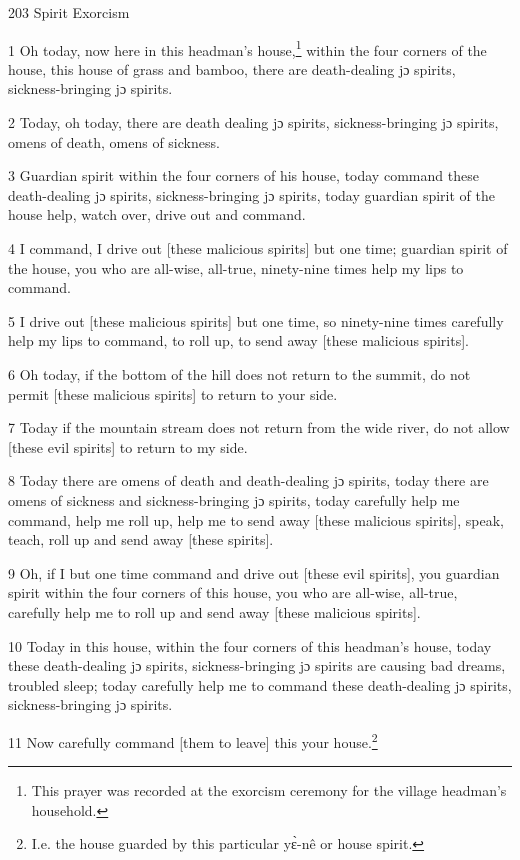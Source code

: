 
203 Spirit Exorcism

1 Oh today, now here in this headman's house,\footnote{This prayer was recorded at the exorcism ceremony for the village headman's household.} within the four corners of the
house, this house of grass and bamboo, there are death-dealing jɔ spirits, sickness-bringing
jɔ spirits.

2 Today, oh today, there are death dealing jɔ spirits, sickness-bringing jɔ spirits,
omens of death, omens of sickness.

3 Guardian spirit within the four corners of his house, today command these death-dealing
jɔ spirits, sickness-bringing jɔ spirits, today guardian spirit of the house
help, watch over, drive out and command.

4 I command, I drive out [these malicious spirits] but one time; guardian spirit
of the house, you who are all-wise, all-true, ninety-nine times help my lips to
command.

5 I drive out [these malicious spirits] but one time, so ninety-nine times carefully
help my lips to command, to roll up, to send away [these malicious spirits].

6 Oh today, if the bottom of the hill does not return to the summit, do not permit
[these malicious spirits] to return to your side.

7 Today if the mountain stream does not return from the wide river, do not allow
[these evil spirits] to return to my side.

8 Today there are omens of death and death-dealing jɔ spirits, today there are
omens of sickness and sickness-bringing jɔ spirits, today carefully help me command,
help me roll up, help me to send away [these malicious spirits], speak, teach,
roll up and send away [these spirits].

9 Oh, if I but one time command and drive out [these evil spirits], you guardian
spirit within the four corners of this house, you who are all-wise, all-true, carefully
help me to roll up and send away [these malicious spirits].

10 Today in this house, within the four corners of this headman's house, today
these death-dealing jɔ spirits, sickness-bringing jɔ spirits are causing bad
dreams, troubled sleep; today carefully help me to command these death-dealing
jɔ spirits, sickness-bringing jɔ spirits.

11 Now carefully command [them to leave] this your house.\footnote{I.e. the house guarded by this particular yɛ̀-nê or house spirit.}

